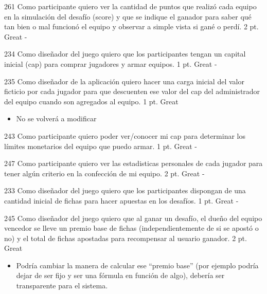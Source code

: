 \vspace{1cm}

\simplestory
{261}
{Como participante quiero ver la cantidad de puntos que realizó cada equipo en la simulación del desafío (score) y que se indique el ganador para saber qué tan bien o mal funcionó el equipo y observar a simple vista si gané o perdí.
}
{2 pt.}
{Great}
{-}

\vspace{1cm}

\simplestory
{234}
{Como diseñador del juego quiero que los participantes tengan un capital inicial (cap) para comprar jugadores y armar equipos.}
{1 pt.}
{Great}
{-}

\vspace{1cm}

\simplestory
{235}
{Como diseñador de la aplicación quiero hacer una carga inicial del valor ficticio por cada jugador para que descuenten ese valor del cap del administrador del equipo cuando son agregados al equipo.}
{1 pt.}
{Great}
{\begin{itemize}
\item No se volverá a modificar
\end{itemize}}

\vspace{1cm}

\simplestory
{243}
{Como participante quiero poder ver/conocer mi cap para determinar los límites monetarios del equipo que puedo armar.}
{1 pt.}
{Great}
{-}

\vspace{1cm}

\simplestory
{247}
{Como participante quiero ver las estadisticas personales de cada jugador para tener algún criterio en la confección de mi equipo.}
{2 pt.}
{Great}
{-}

\vspace{1cm}

\simplestory
{233}
{Como diseñador del juego quiero que los participantes dispongan de una cantidad inicial de fichas para hacer apuestas en los desafíos.}
{1 pt.}
{Great}
{-}

\vspace{1cm}

\simplestory
{245}
{Como diseñador del juego quiero que al ganar un desafío, el dueño del equipo vencedor se lleve un premio base de fichas (independientemente de si se apostó o no) y el total de fichas apostadas para recompensar al usuario ganador.
}
{2 pt.}
{Great}
{\begin{itemize}
\item Podría cambiar la manera de calcular ese ``premio base'' (por ejemplo podría dejar de ser fijo y ser una fórmula en función de algo), debería ser transparente para el sistema.
\end{itemize}}

